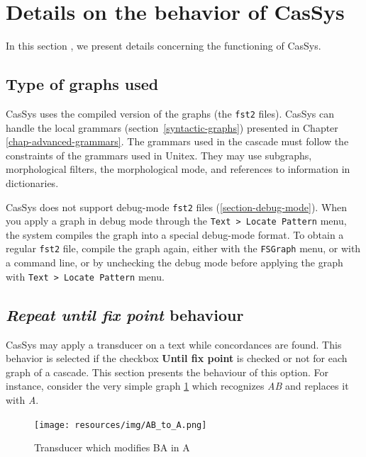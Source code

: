 \section{Details on the behavior of CasSys}

In this section , we present details concerning the functioning of CasSys.

\subsection{Type of graphs used}
\label{graphs-for-cassys}

CasSys uses the compiled version of the graphs (the \verb+fst2+ files). CasSys can handle the local grammars (section~\ref{syntactic-graphs}) presented in Chapter \ref{chap-advanced-grammars}. 
The grammars used in the cascade must follow the constraints of the grammars used in Unitex.
They may use subgraphs, morphological filters, the morphological mode, and references to information in dictionaries.
 
\bigskip
\noindent CasSys does not support debug-mode \verb+fst2+ files (\ref{section-debug-mode}). When you apply a graph in debug mode through the \verb+Text > Locate Pattern+ menu, the system compiles the graph into a special debug-mode format. To obtain a regular \verb+fst2+ file, compile the graph again, either with the \verb+FSGraph+ menu, or with a command line, or by unchecking the debug mode before applying the graph with \verb+Text > Locate Pattern+ menu.

\subsection{\textit{Repeat until fix point} behaviour}
\label{sub:AppWhiCon}

CasSys may apply a transducer on a text while concordances are found. This behavior is selected if the checkbox \textbf{Until fix point} is checked or not for each graph of a cascade.
This section presents the behaviour of this option.
\bigskip
For instance, consider the very simple graph \ref{fig:AB->A} which recognizes \emph{AB} and
replaces it with \emph{A}. 

\begin{figure}[!htb]
  \centering
  \texttt{[image: resources/img/AB\_to\_A.png]}
  \caption{Transducer which modifies BA in A}
  \label{fig:AB->A}
\end{figure}


